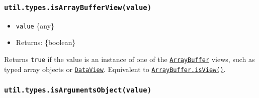 \subsubsection{\texorpdfstring{\texttt{util.types.isArrayBufferView(value)}}{util.types.isArrayBufferView(value)}}\label{util.types.isarraybufferviewvalue}

\begin{itemize}
\tightlist
\item
  \texttt{value} \{any\}
\item
  Returns: \{boolean\}
\end{itemize}

Returns \texttt{true} if the value is an instance of one of the
\href{https://developer.mozilla.org/en-US/docs/Web/JavaScript/Reference/Global_Objects/ArrayBuffer}{\texttt{ArrayBuffer}}
views, such as typed array objects or
\href{https://developer.mozilla.org/en-US/docs/Web/JavaScript/Reference/Global_Objects/DataView}{\texttt{DataView}}.
Equivalent to
\href{https://developer.mozilla.org/en-US/docs/Web/JavaScript/Reference/Global_Objects/ArrayBuffer/isView}{\texttt{ArrayBuffer.isView()}}.

\begin{Shaded}
\begin{Highlighting}[]
\NormalTok{(} \NormalTok{())}\OperatorTok{;}  
\NormalTok{(}\NormalTok{(}\NormalTok{))}\OperatorTok{;} 
\NormalTok{(} \NormalTok{(} \NormalTok{(}\NormalTok{)))}\OperatorTok{;}  
\NormalTok{(} \NormalTok{())}\OperatorTok{;}  
\end{Highlighting}
\end{Shaded}

\subsubsection{\texorpdfstring{\texttt{util.types.isArgumentsObject(value)}}{util.types.isArgumentsObject(value)}}\label{util.types.isargumentsobjectvalue}

